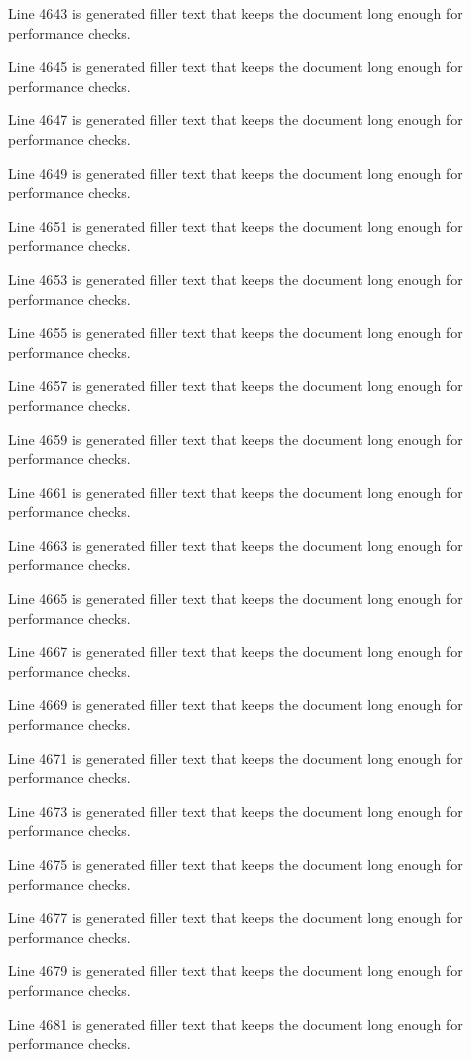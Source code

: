 Line 4643 is generated filler text that keeps the document long enough for performance checks.

Line 4645 is generated filler text that keeps the document long enough for performance checks.

Line 4647 is generated filler text that keeps the document long enough for performance checks.

Line 4649 is generated filler text that keeps the document long enough for performance checks.

Line 4651 is generated filler text that keeps the document long enough for performance checks.

Line 4653 is generated filler text that keeps the document long enough for performance checks.

Line 4655 is generated filler text that keeps the document long enough for performance checks.

Line 4657 is generated filler text that keeps the document long enough for performance checks.

Line 4659 is generated filler text that keeps the document long enough for performance checks.

Line 4661 is generated filler text that keeps the document long enough for performance checks.

Line 4663 is generated filler text that keeps the document long enough for performance checks.

Line 4665 is generated filler text that keeps the document long enough for performance checks.

Line 4667 is generated filler text that keeps the document long enough for performance checks.

Line 4669 is generated filler text that keeps the document long enough for performance checks.

Line 4671 is generated filler text that keeps the document long enough for performance checks.

Line 4673 is generated filler text that keeps the document long enough for performance checks.

Line 4675 is generated filler text that keeps the document long enough for performance checks.

Line 4677 is generated filler text that keeps the document long enough for performance checks.

Line 4679 is generated filler text that keeps the document long enough for performance checks.

Line 4681 is generated filler text that keeps the document long enough for performance checks.

